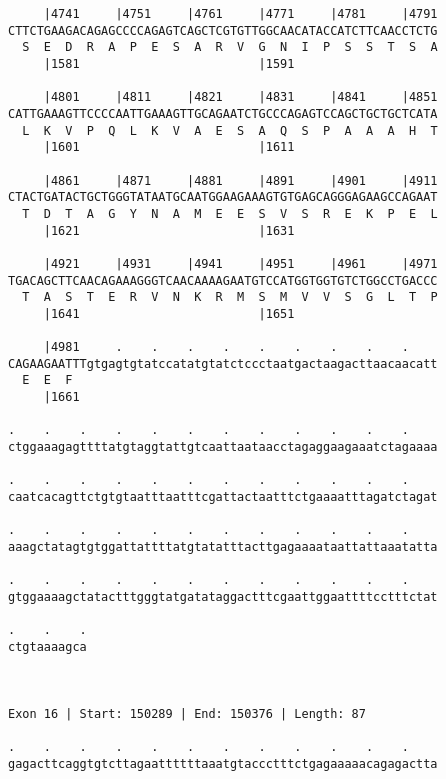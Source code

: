 \documentclass{article}
\begin{document}
\begin{Verbatim}
     |4741     |4751     |4761     |4771     |4781     |4791
CTTCTGAAGACAGAGCCCCAGAGTCAGCTCGTGTTGGCAACATACCATCTTCAACCTCTG
  S  E  D  R  A  P  E  S  A  R  V  G  N  I  P  S  S  T  S  A
     |1581                         |1591                    
  
     |4801     |4811     |4821     |4831     |4841     |4851
CATTGAAAGTTCCCCAATTGAAAGTTGCAGAATCTGCCCAGAGTCCAGCTGCTGCTCATA
  L  K  V  P  Q  L  K  V  A  E  S  A  Q  S  P  A  A  A  H  T
     |1601                         |1611                    
  
     |4861     |4871     |4881     |4891     |4901     |4911
CTACTGATACTGCTGGGTATAATGCAATGGAAGAAAGTGTGAGCAGGGAGAAGCCAGAAT
  T  D  T  A  G  Y  N  A  M  E  E  S  V  S  R  E  K  P  E  L
     |1621                         |1631                    
  
     |4921     |4931     |4941     |4951     |4961     |4971
TGACAGCTTCAACAGAAAGGGTCAACAAAAGAATGTCCATGGTGGTGTCTGGCCTGACCC
  T  A  S  T  E  R  V  N  K  R  M  S  M  V  V  S  G  L  T  P
     |1641                         |1651                    
  
     |4981     .    .    .    .    .    .    .    .    .    
CAGAAGAATTTgtgagtgtatccatatgtatctccctaatgactaagacttaacaacatt
  E  E  F                                                   
     |1661                                                  
  
.    .    .    .    .    .    .    .    .    .    .    .    
ctggaaagagttttatgtaggtattgtcaattaataacctagaggaagaaatctagaaaa
                                                            
.    .    .    .    .    .    .    .    .    .    .    .    
caatcacagttctgtgtaatttaatttcgattactaatttctgaaaatttagatctagat
                                                            
.    .    .    .    .    .    .    .    .    .    .    .    
aaagctatagtgtggattattttatgtatatttacttgagaaaataattattaaatatta
                                                            
.    .    .    .    .    .    .    .    .    .    .    .    
gtggaaaagctatactttgggtatgatataggactttcgaattggaattttcctttctat
                                                            
.    .    .
ctgtaaaagca
           
           
 
Exon 16 | Start: 150289 | End: 150376 | Length: 87
 
.    .    .    .    .    .    .    .    .    .    .    .    
gagacttcaggtgtcttagaattttttaaatgtaccctttctgagaaaaacagagactta
                                                            

\end{Verbatim}
\end{document}
